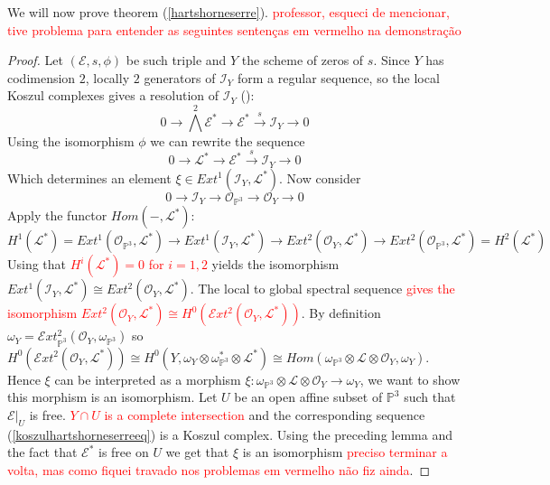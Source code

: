 \documentclass[
	oldfontcommands,
	sumario=abnt-6027-2012,
	12pt,			%
	openright,		%
	oneside,		%
	a4paper,		%
	english,		%
	brazil			%
	]{imecc-unicamp}
\begin{document}
We will now prove theorem (\ref{hartshorneserre}). \textcolor{red}{professor, esqueci de mencionar, tive problema para entender as seguintes sentenças em vermelho na demonstração}
\begin{proof}
Let $(\mathcal{E},s,\phi)$ be such triple and $Y$ the scheme of zeros of $s$. Since $Y$ has codimension $2$, locally $2$ generators of $\mathcal{I}_Y$ form a regular sequence, so the local Koszul complexes gives a resolution of $\mathcal{I}_Y$ (\cite[Hartshorne, proof of II.7.11]{hartshorne_2010}):
\begin{equation}\label{koszulhartshorneserreeq}
0 \to \bigwedge^2\mathcal{E}^* \to \mathcal{E}^* \overset{s}{\to} \mathcal{I}_Y \to 0
\end{equation}
Using the isomorphism $\phi$ we can rewrite the sequence
\begin{equation}
0 \to \mathcal{L}^* \to \mathcal{E}^* \overset{s}{\to} \mathcal{I}_Y \to 0
\end{equation}
Which determines an element $\xi \in Ext^1(\mathcal{I}_Y,\mathcal{L}^*)$. Now consider
\begin{equation}
0 \to \mathcal{I}_Y \to \mathcal{O}_{\mathbb{P}^3} \to \mathcal{O}_Y \to 0
\end{equation}
Apply the functor $Hom(-,\mathcal{L}^*)$:
\begin{equation}
H^1(\mathcal{L}^*)=Ext^1(\mathcal{O}_{\mathbb{P}^3},\mathcal{L}^*) \to Ext^1(\mathcal{I}_Y,\mathcal{L}^*) \to Ext^2(\mathcal{O}_Y, \mathcal{L}^*) \to Ext^2(\mathcal{O}_{\mathbb{P}^3},\mathcal{L}^*)=H^2(\mathcal{L}^*)
\end{equation}
Using that \textcolor{red}{$H^i(\mathcal{L}^*)=0$ for $i=1,2$} yields the isomorphism $Ext^1(\mathcal{I}_Y,\mathcal{L}^*) \cong Ext^2(\mathcal{O}_Y,\mathcal{L}^*)$. The local to global spectral sequence \textcolor{red}{gives the isomorphism $Ext^2(\mathcal{O}_Y,\mathcal{L}^*)\cong H^0(\mathcal{E}xt^2(\mathcal{O}_Y,\mathcal{L}^*))$}. By definition $\omega_{Y}=\mathcal{E}xt^2_{\mathbb{P}^3}(\mathcal{O}_Y,\omega_{\mathbb{P}^3})$ so $H^0(\mathcal{E}xt^2(\mathcal{O}_Y,\mathcal{L}^*)) \cong H^0(Y,\omega_{Y} \otimes \omega_{\mathbb{P}^3}^* \otimes \mathcal{L}^*) \cong Hom(\omega_{\mathbb{P}^3} \otimes \mathcal{L} \otimes \mathcal{O}_Y, \omega_{Y})$. Hence $\xi$ can be interpreted as a morphism $\xi : \omega_{\mathbb{P}^3}\otimes\mathcal{L} \otimes \mathcal{O}_Y \to \omega_Y$, we want to show this morphism is an isomorphism. Let $U$ be an open affine subset of $\mathbb{P}^3$ such that $\mathcal{E}|_U$ is free. \textcolor{red}{$Y \cap U$ is a complete intersection} and the corresponding sequence (\ref{koszulhartshorneserreeq}) is a Koszul complex. Using the preceding lemma and the fact that $\mathcal{E}^*$ is free on $U$ we get that $\xi$ is an isomorphism \textcolor{red}{preciso terminar a volta, mas como fiquei travado nos problemas em vermelho não fiz ainda}.
\end{proof}
\end{document}
